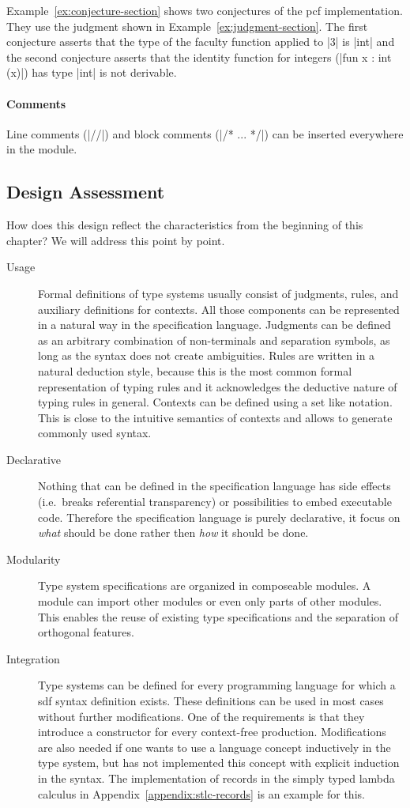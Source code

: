 Example~\ref{ex:conjecture-section} shows two conjectures of the
\gls{pcf} implementation. They use the judgment shown in
Example~\ref{ex:judgment-section}. The first conjecture asserts that
the type of the faculty function applied to \code|3| is \code|int| and
the second conjecture asserts that the identity function for integers
(\code|fun x : int (x)|) has type \code|int| is not derivable.

\paragraph{Comments} Line comments (\code|//|) and block comments
(\code|/* ... */|) can be inserted everywhere in the module.

\subsection{Design Assessment}
How does this design reflect the characteristics from the beginning of
this chapter? We will address this point by point.

\begin{description}
\item[Usage] Formal definitions of type systems usually consist of
  judgments, rules, and auxiliary definitions for contexts. All those
  components can be represented in a natural way in the specification
  language. Judgments can be defined as an arbitrary combination of
  non-terminals and separation symbols, as long as the syntax does not
  create ambiguities. Rules are written in a natural deduction style,
  because this is the most common formal representation of typing
  rules and it acknowledges the deductive nature of typing rules in
  general. Contexts can be defined using a set like notation. This is
  close to the intuitive semantics of contexts and allows to generate
  commonly used syntax.
\item[Declarative] Nothing that can be defined in the specification
  language has side effects (i.e.\ breaks referential transparency) or
  possibilities to embed executable code. Therefore the specification
  language is purely declarative, it focus on \emph{what} should be
  done rather then \emph{how} it should be done.
\item[Modularity] Type system specifications are organized in
  composeable modules. A module can import other modules or even only
  parts of other modules. This enables the reuse of existing type
  specifications and the separation of orthogonal features.
\item[Integration] Type systems can be defined for every programming
  language for which a \gls{sdf} syntax definition exists. These
  definitions can be used in most cases without further
  modifications. One of the requirements is that they introduce a
  constructor for every context-free production. Modifications are
  also needed if one wants to use a language concept inductively in
  the type system, but has not implemented this concept with explicit
  induction in the syntax. The implementation of records in the simply
  typed lambda calculus in Appendix~\ref{appendix:stlc-records} is an
  example for this.
\end{description}
